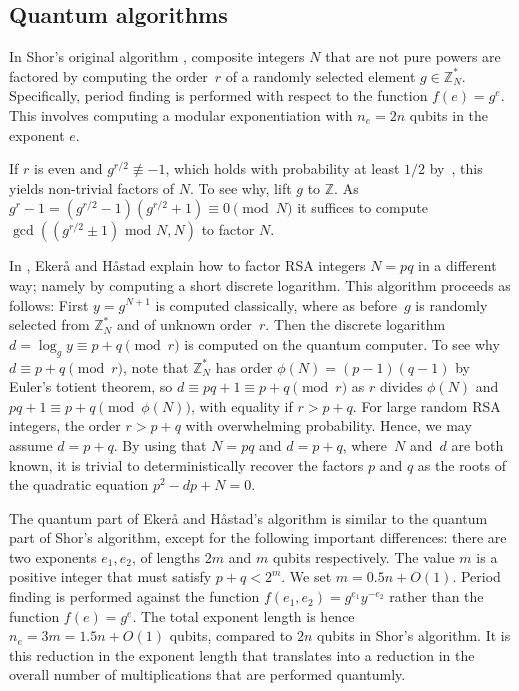 \documentclass[a4paper, onecolumn, accepted=2021-03-29]{quantumarticle}
\newcommand{\lenexp}{{n_e}}
\newcommand{\gen}{g}
\begin{document}
\subsection{Quantum algorithms}

In Shor's original algorithm \cite{shor1994}, composite integers $N$ that are not pure powers are factored by computing the order~$r$ of a randomly selected element $\gen \in \mathbb Z_N^*$.
Specifically, period finding is performed with respect to the function $f(e) = \gen^e$.
This involves computing a modular exponentiation with $\lenexp=2n$ qubits in the exponent $e$.

If $r$ is even and $\gen^{r/2} \not\equiv -1$, which holds with probability at least $1/2$ by~\cite{shor1994}, this yields non-trivial factors of $N$.
To see why, lift $\gen$ to $\mathbb Z$.
As $\gen^r - 1 = (\gen^{r/2} - 1)(\gen^{r/2} + 1)
\equiv 0 \pmod{N}$ it suffices to compute $\gcd((\gen^{r/2} \pm 1) \text{ mod } N, N)$ to factor $N$.

In \cite{ekeraa2016modifying,ekeraa2017quantum,ekeraa2017pp}, Ekerå and Håstad explain how to factor RSA integers $N = pq$ in a different way; namely by computing a short discrete logarithm.
This algorithm proceeds as follows:
First $y = \gen^{N+1}$ is computed classically, where as before~$\gen$ is randomly selected from $\mathbb Z_N^*$ and of unknown order~$r$.
Then the discrete logarithm $d = \log_{\gen} y \equiv p + q \pmod{r}$ is computed on the quantum computer.
To see why $d \equiv p + q \pmod{r}$, note that $\mathbb Z_N^*$ has order $\phi(N) = (p-1)(q-1)$ by Euler's totient theorem, so $d \equiv pq + 1 \equiv p + q \pmod{r}$ as $r$ divides $\phi(N)$ and $pq + 1 \equiv p + q \pmod{\phi(N)}$, with equality if $r > p + q$.
For large random RSA integers, the order $r > p + q$ with overwhelming probability.
Hence, we may assume $d = p + q$.
By using that $N = pq$ and $d=p+q$, where~$N$ and~$d$ are both known, it is trivial to deterministically recover the factors $p$ and $q$ as the roots of the quadratic equation $p^2 - dp + N = 0$.

The quantum part of Ekerå and Håstad's algorithm is similar to the quantum part of Shor's algorithm, except for the following important differences:
there are two exponents $e_1, e_2$, of lengths $2m$ and $m$ qubits respectively.
The value $m$ is a positive integer that must satisfy $p + q < 2^m$.
We set $m = 0.5n + O(1)$.
Period finding is performed against the function $f(e_1, e_2) = \gen^{e_1} y^{-e_2}$ rather than the function $f(e)=\gen^e$.
The total exponent length is hence $n_e = 3m = 1.5n + O(1)$ qubits, compared to $2n$ qubits in Shor's algorithm.
It is this reduction in the exponent length that translates into a reduction in the overall number of multiplications that are performed quantumly.
\end{document}
